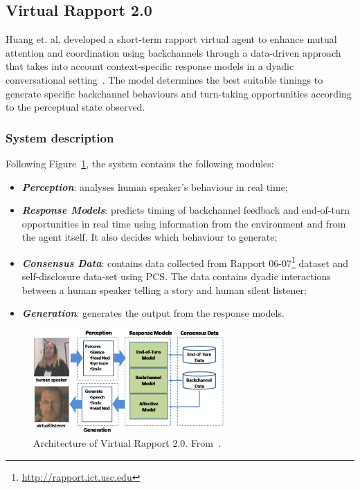 \subsection{Virtual Rapport 2.0}
\label{sub:sec:virtualrapport2}

Huang et. al. developed a short-term rapport virtual agent to enhance mutual attention and coordination using backchannels through a data-driven approach that takes into account context-specific response models in a dyadic conversational setting~\cite{Buschmeier2011}. The model determines the best suitable timings to generate specific backchannel behaviours and turn-taking opportunities according to the perceptual state observed.


\subsubsection*{System description}

Following Figure~\ref{fig:virtualrapport2System}, the system contains the following modules:
\begin{itemize}
	\item \textbf{\textit{Perception}}: analyses human speaker's behaviour in real time;
	\item \textbf{\textit{Response Models}}: predicts timing of backchannel feedback and end-of-turn opportunities in real time using information from the environment and from the agent itself. It also decides which behaviour to generate;
	\item \textbf{\textit{Consensus Data}}: contains data collected from Rapport 06-07\footnote{\url{http://rapport.ict.usc.edu}} dataset and self-disclosure data-set using \ac{PCS}. The data contains dyadic interactions between a human speaker telling a story and human silent listener;
	\item \textbf{\textit{Generation}}: generates the output from the response models.
\end{itemize}

\begin{figure}[hbt]
  \centering
  \includegraphics[width=0.65\textwidth]{Images/VirtualRapport2_System.png}
  \caption{Architecture of Virtual Rapport 2.0. From~\cite{Buschmeier2011}.}
  \label{fig:virtualrapport2System}
\end{figure} 


